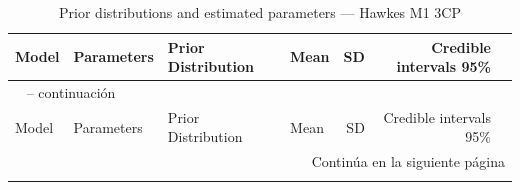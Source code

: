 \begin{longtable}{llllrrr}
\caption{Prior distributions and estimated parameters --- Hawkes M1 3CP} \label{tab:hawkes_params_3cp} \\
\toprule
Model & Parameters & Prior Distribution & Mean & SD & Credible intervals 95\% \\
\midrule
\endfirsthead

\multicolumn{7}{l}{\tablename\ \thetable{} -- continuaci\'{o}n} \\
\toprule
Model & Parameters & Prior Distribution & Mean & SD & Credible intervals 95\% \\
\midrule
\endhead

\midrule
\multicolumn{7}{r}{Contin\'{u}a en la siguiente p\'{a}gina} \\
\endfoot

\bottomrule
\endlastfoot


\end{longtable}
